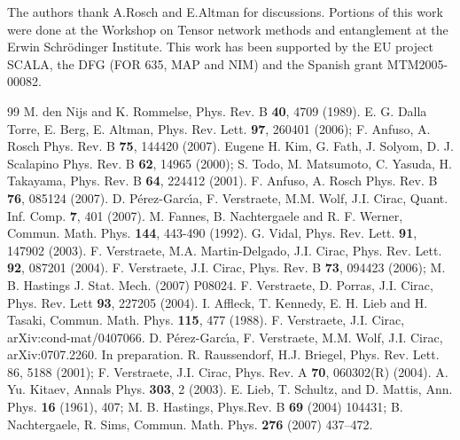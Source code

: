 \documentclass[prl,floatfix,showpacs,amsmat,twocolumn]{revtex4}
\newcommand{\1}{\mathbbm{1}}
\renewcommand{\>}{\rangle}
\newcommand{\<}{\langle}
\begin{document}
The authors thank A.Rosch and E.Altman for discussions. Portions
of this work were done at the Workshop on Tensor network methods
and entanglement at the Erwin Schr\"{o}dinger Institute. This work
has been supported by the EU project SCALA, the DFG (FOR 635, MAP
and NIM) and the Spanish grant MTM2005-00082.



\begin{thebibliography}{99}
     M. den Nijs and K. Rommelse, Phys. Rev. B {\bf 40}, 4709
    (1989).
     E. G. Dalla Torre, E. Berg, E. Altman, Phys. Rev. Lett. {\bf 97}, 260401 (2006); F. Anfuso, A. Rosch Phys. Rev. B {\bf 75}, 144420 (2007).
       Eugene H. Kim, G. Fath, J. Solyom, D. J. Scalapino Phys. Rev. B {\bf 62}, 14965 (2000); S. Todo, M. Matsumoto, C. Yasuda, H. Takayama, Phys. Rev. B {\bf 64}, 224412 (2001).
     F. Anfuso, A. Rosch Phys. Rev. B {\bf 76}, 085124 (2007).
      D.
    P\'erez-Garc\'{\i}a, F. Verstraete, M.M. Wolf,  J.I. Cirac, Quant.
    Inf. Comp. {\bf 7}, 401 (2007).
      M. Fannes,
    B. Nachtergaele and R. F. Werner, Commun. Math. Phys.
    \textbf{144}, 443-490 (1992).
     G. Vidal, Phys. Rev. Lett. {\bf 91}, 147902
    (2003).
      F. Verstraete, M.A. Martin-Delgado, J.I. Cirac, Phys. Rev. Lett. {\bf 92}, 087201 (2004).
     F. Verstraete, J.I. Cirac, Phys. Rev. B {\bf 73}, 094423 (2006); M. B. Hastings J. Stat. Mech. (2007) P08024.
     F. Verstraete, D. Porras, J.I. Cirac, Phys. Rev. Lett  {\bf 93}, 227205 (2004).
     I. Affleck, T. Kennedy, E. H. Lieb and H.
    Tasaki, Commun. Math. Phys. \textbf{115}, 477 (1988).
     F. Verstraete, J.I. Cirac, arXiv:cond-mat/0407066.
      D.
    P\'erez-Garc\'{\i}a, F. Verstraete, M.M. Wolf,  J.I. Cirac, arXiv:0707.2260.
     In preparation.
     R. Raussendorf, H.J. Briegel, Phys. Rev. Lett. 86,
    5188 (2001); F. Verstraete, J.I. Cirac, Phys. Rev. A
    \textbf{70}, 060302(R) (2004).
     A. Yu. Kitaev, Annals Phys. \textbf{303}, 2 (2003).
      E. Lieb, T. Schultz, and D. Mattis, Ann. Phys.
        {\bf 16} (1961), 407; M. B. Hastings, Phys.Rev. B {\bf 69} (2004) 104431;  B. Nachtergaele, R. Sims, Commun. Math. Phys. {\bf 276} (2007) 437--472.

\end{thebibliography}
\end{document}
